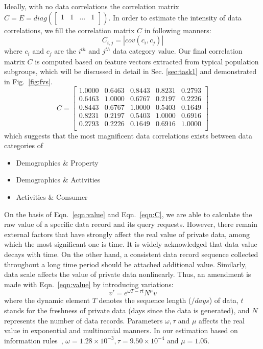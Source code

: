 \documentclass{mcmthesis}
\begin{document}
Ideally, with no data correlations the correlation matrix $C = E = diag\left(\left[\begin{matrix} 1 & 1 & \dots & 1 \\ \end{matrix}\right]\right)$. In order to estimate the intensity of data correlations, we fill the correlation matrix $C$ in following manners:
\begin{equation}
    C_{i, j} = \left|cov(c_i, c_j)\right|
\end{equation}
where $c_i$ and $c_j$ are the $i^{th}$ and $j^{th}$ data category value. Our final correlation matrix $C$ is computed based on feature vectors extracted from typical population subgroups, which will be discussed in detail in Sec. \ref{sec:task1} and demonstrated in Fig.~\ref{fig:fvs}.
\begin{equation}
    C = \left[\begin{matrix} 1.0000 & 0.6463 & 0.8443 & 0.8231 & 0.2793 \\
    0.6463 & 1.0000 & 0.6767 & 0.2197 & 0.2226 \\
    0.8443 & 0.6767 & 1.0000 & 0.5403 & 0.1649 \\
    0.8231 & 0.2197 & 0.5403 & 1.0000 & 0.6916 \\
    0.2793 & 0.2226 & 0.1649 & 0.6916 & 1.0000 \\ \end{matrix}\right] \label{eqn:C}
\end{equation}
which suggests that the most magnificent data correlations exists between data categories of
\begin{itemize}
\item Demographics \& Property
\item Demographics \& Activities
\item Activities \& Consumer
\end{itemize}

On the basis of Eqn.~\eqref{eqn:value} and Eqn.~\eqref{eqn:C}, we are able to calculate the raw value of a specific data record and its query requests. However, there remain external factors that have strongly affect the real value of private data, among which the most significant one is time. It is widely acknowledged that data value decays with time. On the other hand, a consistent data record sequence collected throughout a long time period should be attached additional value. Similarly, data scale affects the value of private data nonlinearly. Thus, an amendment is made with Eqn.~\eqref{eqn:value} by introducing variations:
\begin{equation}
    v' = e^{\omega T - \tau t} N^{\mu} v\label{eqn:amend}
\end{equation}
where the dynamic element $T$ denotes the sequence length ($/ days$) of data, $t$ stands for the freshness of private data (days since the data is generated), and $N$ represents the number of data records. Parameters $\omega, \tau$ and $\mu$ affects the real value in exponential and multinomial manners. In our estimation based on information rules~\cite{shapiro1998information}, $\omega = 1.28 \times 10^{-3}, \tau = 9.50\times 10^{-4} \text{ and } \mu = 1.05$. 
\end{document}
